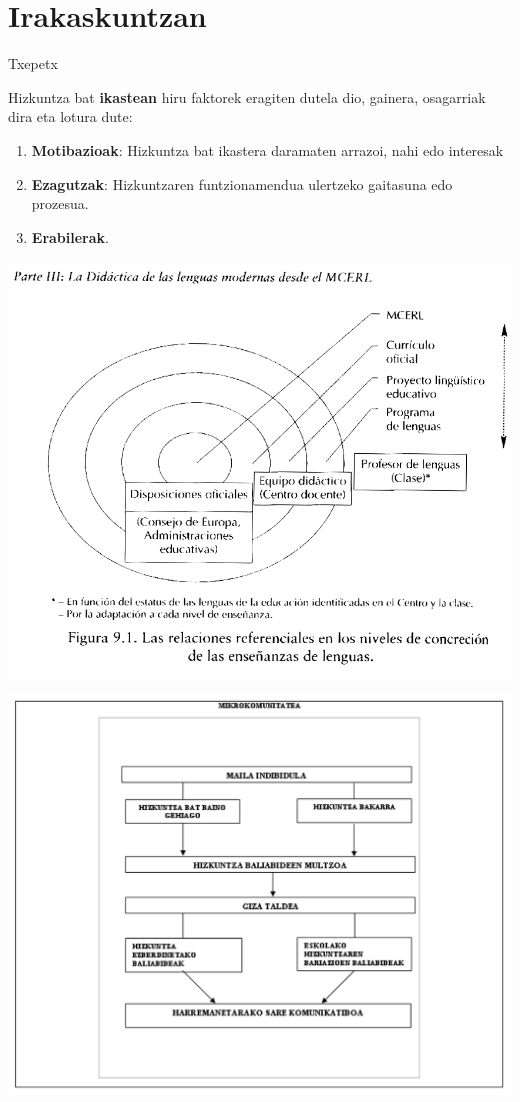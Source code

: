 \documentclass[]{book}
\begin{document}
\hypertarget{irakaskuntzan}{%
\section{Irakaskuntzan}\label{irakaskuntzan}}

Txepetx

Hizkuntza bat \textbf{ikastean }hiru faktorek eragiten dutela dio, gainera, osagarriak dira eta lotura dute:

\begin{enumerate}
\def\labelenumi{\arabic{enumi}.}
\item
  \textbf{Motibazioak}: Hizkuntza bat ikastera daramaten arrazoi, nahi edo interesak
\item
  \textbf{Ezagutzak}: Hizkuntzaren funtzionamendua ulertzeko gaitasuna edo prozesua.
\item
  \textbf{Erabilerak}.
\end{enumerate}

\includegraphics{assets/01_01-HD.png}

\includegraphics{assets/01_02-HD.png}
\end{document}
